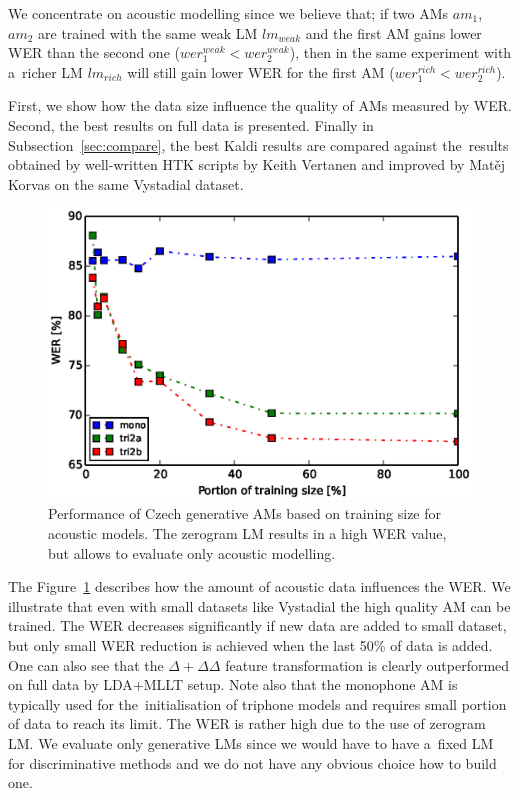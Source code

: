We concentrate on acoustic modelling since we believe that; if two \acp{AM} $am_1$, $am_2$ are trained with the same weak \acl{LM} $lm_{weak}$ and the first \ac{AM} gains lower \ac{WER} than the second one ($wer^{weak}_{1} <  wer^{weak}_{2}$), then in the same experiment with a~richer \ac{LM} $lm_{rich}$ will still gain lower \ac{WER} for the first \ac{AM} ($wer^{rich}_{1} <  wer^{rich}_{2}$).

First, we show how the data size influence the quality of \acp{AM} measured by \ac{WER}.
Second,  the best results on full data is presented.
Finally in Subsection~\ref{sec:compare}, the best Kaldi results are compared against the~results obtained by well-written \ac{HTK} scripts by Keith Vertanen and improved by Matěj Korvas \cite{korvas_2014} on the same Vystadial dataset.

\begin{figure}[!htp]
    \begin{center}
    \includegraphics[scale=0.7]{images/partial-zerogram.ps}
    \caption{Performance of Czech generative \acp{AM} based on training size for acoustic models. The zerogram LM results in a high WER value, but allows to evaluate only acoustic modelling.}
    \label{fig:partials} 
    \end{center}
\end{figure}

The Figure~\ref{fig:partials} describes how the amount of acoustic data influences the \ac{WER}.
We illustrate that even with small datasets like Vystadial the high quality \ac{AM} can be trained.
The WER decreases significantly if new data are added to small dataset, but only small \ac{WER} reduction is achieved when the last 50\% of data is added.
One can also see that the $\Delta+\Delta\Delta$ feature transformation is clearly outperformed on full data by \ac{LDA}+\ac{MLLT} setup.
Note also that the monophone \ac{AM} is typically used for the~initialisation of triphone models and requires small portion of data to reach its limit.
The WER is rather high due to the use of zerogram \ac{LM}.
We evaluate only generative \acp{LM} since we would have to have a~fixed LM for discriminative methods and we do not have any obvious choice how to build one.

